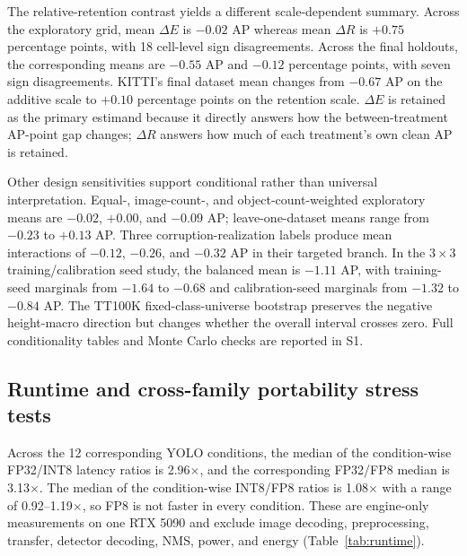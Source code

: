 \documentclass[a4paper,fleqn]{cas-dc}
\begin{document}
The relative-retention contrast yields a different scale-dependent summary. Across the exploratory grid, mean $\Delta E$ is $-0.02$ AP whereas mean $\Delta R$ is $+0.75$ percentage points, with 18 cell-level sign disagreements. Across the final holdouts, the corresponding means are $-0.55$ AP and $-0.12$ percentage points, with seven sign disagreements. KITTI's final dataset mean changes from $-0.67$ AP on the additive scale to $+0.10$ percentage points on the retention scale. $\Delta E$ is retained as the primary estimand because it directly answers how the between-treatment AP-point gap changes; $\Delta R$ answers how much of each treatment's own clean AP is retained.

\begin{table}[t]
\centering
\caption{Metric-scale sensitivity, with scope-wide summaries separated from dataset rows. $\Delta R$ is the FP8-minus-INT8 difference in the percentage of clean AP retained, using each evidence layer's recorded clean control. Sign differences are counted between cell-level point estimates of $\Delta E$ and $\Delta R$, not between interval-based decisions.}
\label{tab:relative-retention}
\small
\setlength{\tabcolsep}{6pt}

\end{table}

Other design sensitivities support conditional rather than universal interpretation. Equal-, image-count-, and object-count-weighted exploratory means are $-0.02$, $+0.00$, and $-0.09$ AP; leave-one-dataset means range from $-0.23$ to $+0.13$ AP. Three corruption-realization labels produce mean interactions of $-0.12$, $-0.26$, and $-0.32$ AP in their targeted branch. In the $3\times3$ training/calibration seed study, the balanced mean is $-1.11$ AP, with training-seed marginals from $-1.64$ to $-0.68$ and calibration-seed marginals from $-1.32$ to $-0.84$ AP. The TT100K fixed-class-universe bootstrap preserves the negative height-macro direction but changes whether the overall interval crosses zero. Full conditionality tables and Monte Carlo checks are reported in S1.

\subsection{Runtime and cross-family portability stress tests}
\label{sec:runtime-results}
\label{sec:crossfamily-results}
\label{sec:attachment-results}
\label{sec:tide-results}

Across the 12 corresponding YOLO conditions, the median of the condition-wise FP32/INT8 latency ratios is 2.96$\times$, and the corresponding FP32/FP8 median is 3.13$\times$. The median of the condition-wise INT8/FP8 ratios is 1.08$\times$ with a range of 0.92--1.19$\times$, so FP8 is not faster in every condition. These are engine-only measurements on one RTX 5090 and exclude image decoding, preprocessing, transfer, detector decoding, NMS, power, and energy (Table~\ref{tab:runtime}).
\end{document}
